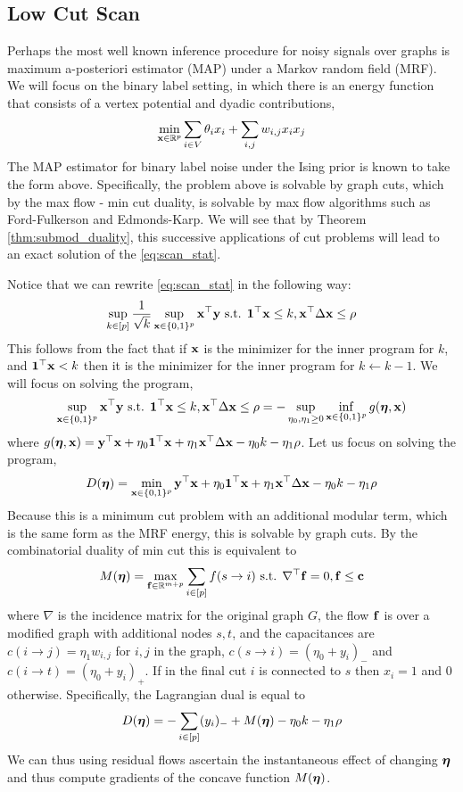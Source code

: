 \subsection{Low Cut Scan}

Perhaps the most well known inference procedure for noisy signals over graphs is maximum a-posteriori estimator (MAP) under a Markov random field (MRF).
We will focus on the binary label setting, in which there is an energy function that consists of a vertex potential and dyadic contributions,
\[
\min_{\mathbf{x} \in \mathbb{R}^p} \sum_{i \in V} \theta_i x_i + \sum_{i,j} w_{i,j} x_i x_j
\]
The MAP estimator for binary label noise under the Ising prior is known to take the form above.
Specifically, the problem above is solvable by graph cuts, which by the max flow - min cut duality, is solvable by max flow algorithms such as Ford-Fulkerson and Edmonds-Karp.
We will see that by Theorem \ref{thm:submod_duality}, this successive applications of cut problems will lead to an exact solution of the \eqref{eq:scan_stat}.

Notice that we can rewrite \eqref{eq:scan_stat} in the following way:
\[
\sup_{k \in [p]} \frac{1}{\sqrt{k}} \sup_{\mathbf{x} \in \{0,1\}^p} \mathbf{x}^\top \mathbf{y} \textrm{ s.t. } {\bf 1}^\top \mathbf{x} \le k, \mathbf{x}^\top \Delta \mathbf{x} \le \rho  
\]
This follows from the fact that if $\mathbf{x}$ is the minimizer for the inner program for $k$, and ${\bf 1}^\top \mathbf{x} < k$ then it is the minimizer for the inner program for $k \leftarrow k - 1$.
We will focus on solving the program,
\begin{equation}
\label{eq:inner_prog}
\sup_{\mathbf{x} \in \{0,1\}^p} \mathbf{x}^\top \mathbf{y} \textrm{ s.t. } {\bf 1}^\top \mathbf{x} \le k, \mathbf{x}^\top \Delta \mathbf{x} \le \rho = - \sup_{\eta_0, \eta_1 \ge 0} \inf_{\mathbf{x} \in \{0,1\}^p} g(\bm{\eta},\mathbf{x})
\end{equation}
where $g(\bm{\eta},\mathbf{x}) = \mathbf{y}^\top \mathbf{x} + \eta_0 {\bf 1}^\top \mathbf{x} + \eta_1 \mathbf{x}^\top \Delta \mathbf{x} - \eta_0 k - \eta_1 \rho$.
Let us focus on solving the program,
\[
D(\bm{\eta}) = \min_{\mathbf{x} \in \{0,1\}^p} \mathbf{y}^\top \mathbf{x} + \eta_0 {\bf 1}^\top \mathbf{x} + \eta_1 \mathbf{x}^\top \Delta \mathbf{x} - \eta_0 k - \eta_1 \rho
\]
Because this is a minimum cut problem with an additional modular term, which is the same form as the MRF energy, this is solvable by graph cuts.
By the combinatorial duality of min cut this is equivalent to 
\[
M(\bm{\eta}) = \max_{\mathbf{f} \in \mathbb{R}^{m + p}} \sum_{i \in [p]} f(s \rightarrow i) \textrm{ s.t. } \nabla^\top \mathbf{f} = 0, \mathbf{f} \le \mathbf{c}
\]
where $\nabla$ is the incidence matrix for the original graph $G$, the flow $\mathbf{f}$ is over a modified graph with additional nodes $s,t$, and the capacitances are $c(i\rightarrow j) = \eta_1 w_{i,j}$ for $i,j$ in the graph, $c(s \rightarrow i) = (\eta_0 + y_i)_-$ and $c(i \rightarrow t) = (\eta_0 + y_i)_+$.
If in the final cut $i$ is connected to $s$ then $x_i = 1$ and $0$ otherwise.
Specifically, the Lagrangian dual is equal to 
\[
D(\bm{\eta}) = - \sum_{i \in [p]} (y_i)_- + M(\bm{\eta}) - \eta_0 k - \eta_1 \rho
\]
We can thus using residual flows ascertain the instantaneous effect of changing $\bm{\eta}$ and thus compute gradients of the concave function $M(\bm{\eta})$.

